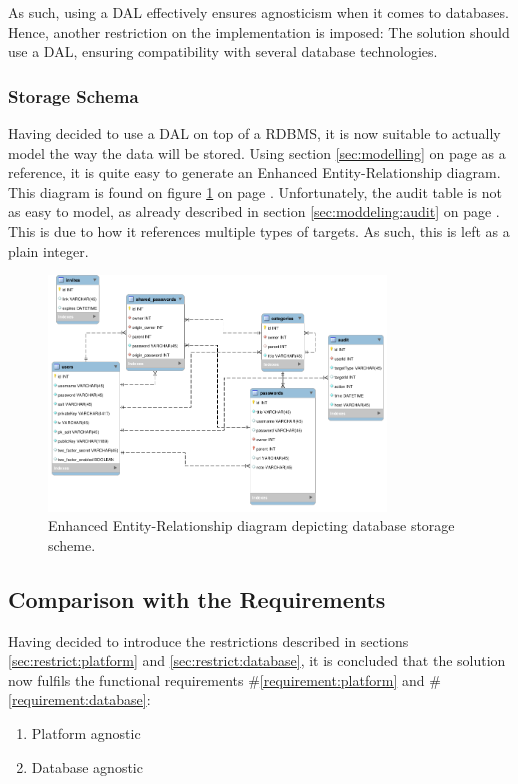 			As such, using a DAL effectively ensures agnosticism when it comes to databases. Hence, another restriction on the implementation is imposed: The solution should use a DAL, ensuring compatibility with several database technologies.	

			\subsubsection{Storage Schema}
				Having decided to use a DAL on top of a RDBMS, it is now suitable to actually model the way the data will be stored. Using section \ref{sec:modelling} on page \pageref{sec:modelling} as a reference, it is quite easy to generate an Enhanced Entity-Relationship diagram. This diagram is found on figure \ref{fig:eer} on page \pageref{fig:eer}. Unfortunately, the audit table is not as easy to model, as already described in section \ref{sec:moddeling:audit} on page \pageref{sec:moddeling:audit}. This is due to how it references multiple types of targets. As such, this is left as a plain integer.

				\begin{figure}[p]
					\centering
					\includegraphics[width=0.8\textwidth]{figures/design/png/database2.png}
					\caption{Enhanced Entity-Relationship diagram depicting database storage scheme.}
					\label{fig:eer}
				\end{figure}
		\subsection{Comparison with the Requirements}
			\label{requirement:fulfilled:database}
			\label{requirement:fulfilled:platform}

			Having decided to introduce the restrictions described in sections \ref{sec:restrict:platform} and \ref{sec:restrict:database}, it is concluded that the solution now fulfils the functional requirements \#\ref{requirement:platform} and \#\ref{requirement:database}:
			\vspace{-3ex}\begin{enumerate}
				\setlength\itemsep{0.1em}
				\setcounter{enumi}{7-1}
				\item Platform agnostic
				\item Database agnostic
			\end{enumerate}

